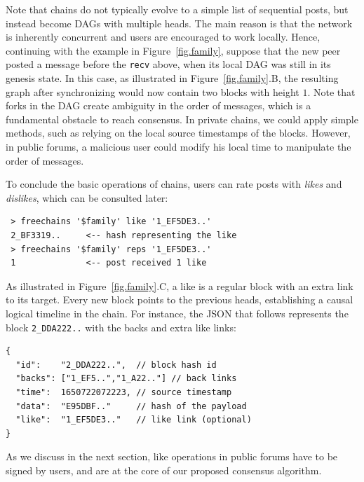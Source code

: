 \documentclass[12pt]{article}
\newcommand{\code}[1]  {\texttt{\footnotesize{#1}}}
\begin{document}
Note that chains do not typically evolve to a simple list of sequential posts,
but instead become DAGs with multiple heads.
The main reason is that the network is inherently concurrent and users are
encouraged to work locally.
Hence, continuing with the example in Figure~\ref{fig.family}, suppose that the
new peer posted a message before the \code{recv} above, when its local DAG was
still in its genesis state.
In this case, as illustrated in Figure~\ref{fig.family}.B, the resulting graph
after synchronizing would now contain two blocks with height $1$.
%
Note that forks in the DAG create ambiguity in the order of messages, which is
a fundamental obstacle to reach consensus.
In private chains, we could apply simple methods, such as relying on the local
source timestamps of the blocks.
However, in public forums, a malicious user could modify his local time to
manipulate the order of messages.

To conclude the basic operations of chains, users can rate posts with
\emph{likes} and \emph{dislikes}, which can be consulted later:

{\footnotesize
\begin{verbatim}
 > freechains '$family' like '1_EF5DE3..'
 2_BF3319..     <-- hash representing the like
 > freechains '$family' reps '1_EF5DE3..'
 1              <-- post received 1 like
\end{verbatim}
}

As illustrated in Figure~\ref{fig.family}.C, a like is a regular block with an
extra link to its target.
Every new block points to the previous heads, establishing a causal logical
timeline in the chain.
For instance, the JSON that follows represents the block \code{2\_DDA222..}
with the backs and extra like links:

{\footnotesize
\begin{verbatim}
{
  "id":    "2_DDA222..",  // block hash id
  "backs": ["1_EF5..","1_A22.."] // back links
  "time":  1650722072223, // source timestamp
  "data":  "E95DBF.."     // hash of the payload
  "like":  "1_EF5DE3.."   // like link (optional)
}
\end{verbatim}
}

As we discuss in the next section, like operations in public forums have to be
signed by users, and are at the core of our proposed consensus algorithm.
\end{document}
